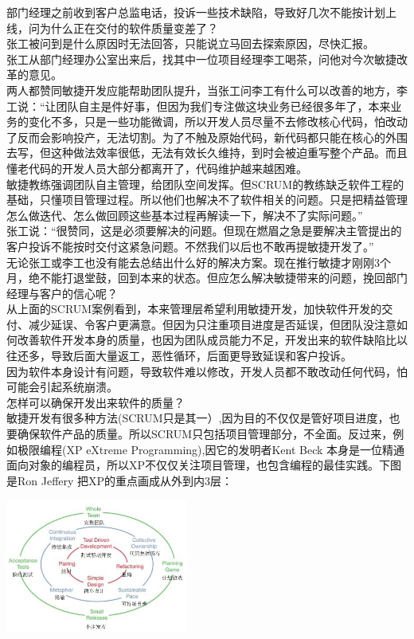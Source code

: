 部门经理之前收到客户总监电话，投诉一些技术缺陷，导致好几次不能按计划上线，问为什么正在交付的软件质量变差了？\\
张工被问到是什么原因时无法回答，只能说立马回去探索原因，尽快汇报。\\
张工从部门经理办公室出来后，找其中一位项目经理李工喝茶，问他对今次敏捷改革的意见。\\
两人都赞同敏捷开发应能帮助团队提升，当张工问李工有什么可以改善的地方，李工说：“让团队自主是件好事，但因为我们专注做这块业务已经很多年了，本来业务的变化不多，只是一些功能微调，所以开发人员尽量不去修改核心代码，怕改动了反而会影响投产，无法切割。为了不触及原始代码，新代码都只能在核心的外围去写，但这种做法效率很低，无法有效长久维持，到时会被迫重写整个产品。而且懂老代码的开发人员大部分都离开了，代码维护越来越困难。\\
敏捷教练强调团队自主管理，给团队空间发挥。但SCRUM的教练缺乏软件工程的基础，只懂项目管理过程。所以他们也解决不了软件相关的问题。只是把精益管理怎么做迭代、怎么做回顾这些基本过程再解读一下，解决不了实际问题。''\\
张工说：``很赞同，这是必须要解决的问题。但现在燃眉之急是要解决主管提出的客户投诉不能按时交付这紧急问题。不然我们以后也不敢再提敏捷开发了。''\\
无论张工或李工也没有能去总结出什么好的解决方案。现在推行敏捷才刚刚3个月，绝不能打退堂鼓，回到本来的状态。但应怎么解决敏捷带来的问题，挽回部门经理与客户的信心呢？\\

从上面的SCRUM案例看到，本来管理层希望利用敏捷开发，加快软件开发的交付、减少延误、令客户更满意。但因为只注重项目进度是否延误，但团队没注意如何改善软件开发本身的质量，也因为团队成员能力不足，开发出来的软件缺陷比以往还多，导致后面大量返工，恶性循环，后面更导致延误和客户投诉。\\
因为软件本身设计有问题，导致软件难以修改，开发人员都不敢改动任何代码，怕可能会引起系统崩溃。\\
怎样可以确保开发出来软件的质量？\\
敏捷开发有很多种方法(SCRUM只是其一）,因为目的不仅仅是管好项目进度，也要确保软件产品的质量。所以SCRUM只包括项目管理部分，不全面。反过来，例如极限编程(XP
eXtreme Programming),因它的发明者Kent Beck
本身是一位精通面向对象的编程员，所以XP不仅仅关注项目管理，也包含编程的最佳实践。下图是Ron
Jeffery 把XP的重点画成从外到内3层：


\includegraphics[width=6cm]{Cleanagile_f181.jpg}

